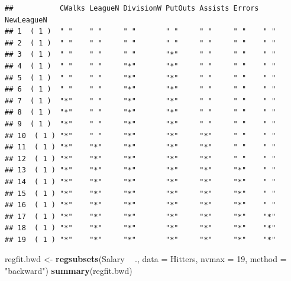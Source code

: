 \documentclass[
  12pt,
]{book}
\newenvironment{Shaded}{\begin{snugshade}}{\end{snugshade}}
\newcommand{\DataTypeTok}[1]{\textcolor[rgb]{0.13,0.29,0.53}{#1}}
\newcommand{\DecValTok}[1]{\textcolor[rgb]{0.00,0.00,0.81}{#1}}
\newcommand{\KeywordTok}[1]{\textcolor[rgb]{0.13,0.29,0.53}{\textbf{#1}}}
\newcommand{\NormalTok}[1]{#1}
\newcommand{\OperatorTok}[1]{\textcolor[rgb]{0.81,0.36,0.00}{\textbf{#1}}}
\newcommand{\StringTok}[1]{\textcolor[rgb]{0.31,0.60,0.02}{#1}}
\theoremstyle{definition}
\theoremstyle{definition}
\theoremstyle{definition}
\theoremstyle{remark}
\begin{document}
\begin{verbatim}
##           CWalks LeagueN DivisionW PutOuts Assists Errors NewLeagueN
## 1  ( 1 )  " "    " "     " "       " "     " "     " "    " "       
## 2  ( 1 )  " "    " "     " "       " "     " "     " "    " "       
## 3  ( 1 )  " "    " "     " "       "*"     " "     " "    " "       
## 4  ( 1 )  " "    " "     "*"       "*"     " "     " "    " "       
## 5  ( 1 )  " "    " "     "*"       "*"     " "     " "    " "       
## 6  ( 1 )  " "    " "     "*"       "*"     " "     " "    " "       
## 7  ( 1 )  "*"    " "     "*"       "*"     " "     " "    " "       
## 8  ( 1 )  "*"    " "     "*"       "*"     " "     " "    " "       
## 9  ( 1 )  "*"    " "     "*"       "*"     " "     " "    " "       
## 10  ( 1 ) "*"    " "     "*"       "*"     "*"     " "    " "       
## 11  ( 1 ) "*"    "*"     "*"       "*"     "*"     " "    " "       
## 12  ( 1 ) "*"    "*"     "*"       "*"     "*"     " "    " "       
## 13  ( 1 ) "*"    "*"     "*"       "*"     "*"     "*"    " "       
## 14  ( 1 ) "*"    "*"     "*"       "*"     "*"     "*"    " "       
## 15  ( 1 ) "*"    "*"     "*"       "*"     "*"     "*"    " "       
## 16  ( 1 ) "*"    "*"     "*"       "*"     "*"     "*"    " "       
## 17  ( 1 ) "*"    "*"     "*"       "*"     "*"     "*"    "*"       
## 18  ( 1 ) "*"    "*"     "*"       "*"     "*"     "*"    "*"       
## 19  ( 1 ) "*"    "*"     "*"       "*"     "*"     "*"    "*"
\end{verbatim}

\begin{Shaded}
\begin{Highlighting}[]
\NormalTok{regfit.bwd <-}\StringTok{ }\KeywordTok{regsubsets}\NormalTok{(Salary }\OperatorTok{~}\StringTok{ }\NormalTok{., }\DataTypeTok{data =}\NormalTok{ Hitters, }
    \DataTypeTok{nvmax =} \DecValTok{19}\NormalTok{, }\DataTypeTok{method =} \StringTok{"backward"}\NormalTok{)}
\KeywordTok{summary}\NormalTok{(regfit.bwd)}
\end{Highlighting}
\end{Shaded}
\end{document}
